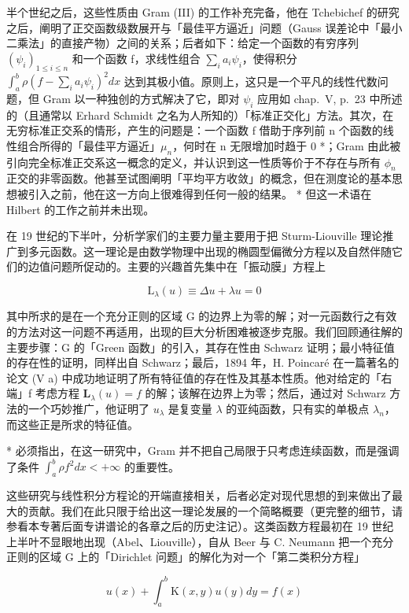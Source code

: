 半个世纪之后，这些性质由 Gram (III) 的工作补充完备，他在 Tchebichef 的研究之后，阐明了正交函数级数展开与「最佳平方逼近」问题（Gauss 误差论中「最小二乘法」的直接产物）之间的关系；后者如下：给定一个函数的有穷序列 \((\psi_{i})_{1\leqslant i\leqslant n}\) 和一个函数 f，求线性组合 \(\sum_{i}a_{i}\psi_{i}\)，使得积分 \(\int_{a}^{b}\rho (f - \sum_{i}a_{i}\psi_{i})^{2}dx\) 达到其极小值。原则上，这只是一个平凡的线性代数问题，但 Gram 以一种独创的方式解决了它，即对 \(\psi_{i}\) 应用如 chap.~V, p.~23 中所述的（且通常以 Erhard Schmidt 之名为人所知的）「标准正交化」方法。其次，在无穷标准正交系的情形，产生的问题是：一个函数 f 借助于序列前 n 个函数的线性组合所得的「最佳平方逼近」\(\mu_{n}\)，何时在 n 无限增加时趋于 0 *；Gram 由此被引向完全标准正交系这一概念的定义，并认识到这一性质等价于不存在与所有 \(\phi_{n}\) 正交的非零函数。他甚至试图阐明「平均平方收敛」的概念，但在测度论的基本思想被引入之前，他在这一方向上很难得到任何一般的结果。
* 但这一术语在 Hilbert 的工作之前并未出现。

在 19 世纪的下半叶，分析学家们的主要力量主要用于把 Sturm-Liouville 理论推广到多元函数。这一理论是由数学物理中出现的椭圆型偏微分方程以及自然伴随它们的边值问题所促动的。主要的兴趣首先集中在「振动膜」方程上

\[
\mathrm{L} _ {\lambda} (u) \equiv \Delta u + \lambda u = 0\tag{3}
\]

其中所求的是在一个充分正则的区域 G 的边界上为零的解；对一元函数行之有效的方法对这一问题不再适用，出现的巨大分析困难被逐步克服。我们回顾通往解的主要步骤：G 的「Green 函数」的引入，其存在性由 Schwarz 证明；最小特征值的存在性的证明，同样出自 Schwarz；最后，1894 年，H. Poincaré 在一篇著名的论文 (V a) 中成功地证明了所有特征值的存在性及其基本性质。他对给定的「右端」f 考虑方程 \(\mathbf{L}_{\lambda}(u) = f\) 的解；该解在边界上为零；然后，通过对 Schwarz 方法的一个巧妙推广，他证明了 \(u_{\lambda}\) 是复变量 \(\lambda\) 的亚纯函数，只有实的单极点 \(\lambda_{n}\)，而这些正是所求的特征值。

* 必须指出，在这一研究中，Gram 并不把自己局限于只考虑连续函数，而是强调了条件 \(\int_{a}^{b} \rho f^2 dx < +\infty\) 的重要性。

这些研究与线性积分方程论的开端直接相关，后者必定对现代思想的到来做出了最大的贡献。我们在此只限于给出这一理论发展的一个简略概要（更完整的细节，请参看本专著后面专讲谱论的各章之后的历史注记）。这类函数方程最初在 19 世纪上半叶不显眼地出现（Abel、Liouville），自从 Beer 与 C. Neumann 把一个充分正则的区域 G 上的「Dirichlet 问题」的解化为对一个「第二类积分方程」

\[
u (x) + \int_ {a} ^ {b} \mathrm{K} (x, y) u (y) d y = f (x)\tag{4}
\]


